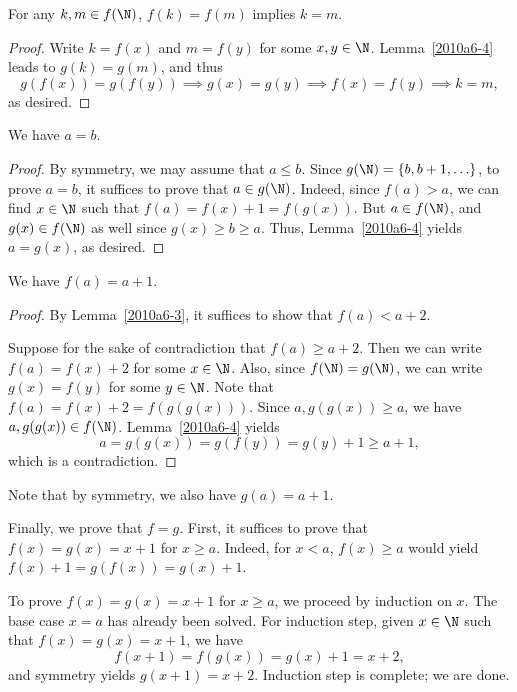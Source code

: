 \begin{lemma}\label{2010a6-4}
For any $k, m \in f(\N)$, $f(k) = f(m)$ implies $k = m$.
\end{lemma}
\begin{proof}
Write $k = f(x)$ and $m = f(y)$ for some $x, y \in \N$.
Lemma~\ref{2010a6-4} leads to $g(k) = g(m)$, and thus
\[ g(f(x)) = g(f(y)) \implies g(x) = g(y) \implies f(x) = f(y) \implies k = m, \]
    as desired.
\end{proof}

\begin{lemma}\label{2010a6-5}
We have $a = b$.
\end{lemma}
\begin{proof}
By symmetry, we may assume that $a \leq b$.
Since $g(\N) = \{b, b + 1, \ldots\}$, to prove $a = b$, it suffices to prove that $a \in g(\N)$.
Indeed, since $f(a) > a$, we can find $x \in \N$ such that $f(a) = f(x) + 1 = f(g(x))$.
But $a \in f(\N)$, and $g(x) \in f(\N)$ as well since $g(x) \geq b \geq a$.
Thus, Lemma~\ref{2010a6-4} yields $a = g(x)$, as desired.
\end{proof}

\begin{lemma}\label{2010a6-6}
We have $f(a) = a + 1$.
\end{lemma}
\begin{proof}
By Lemma~\ref{2010a6-3}, it suffices to show that $f(a) < a + 2$.

Suppose for the sake of contradiction that $f(a) \geq a + 2$.
Then we can write $f(a) = f(x) + 2$ for some $x \in \N$.
Also, since $f(\N) = g(\N)$, we can write $g(x) = f(y)$ for some $y \in \N$.
Note that $f(a) = f(x) + 2 = f(g(g(x)))$.
Since $a, g(g(x)) \geq a$, we have $a, g(g(x)) \in f(\N)$.
Lemma~\ref{2010a6-4} yields
\[ a = g(g(x)) = g(f(y)) = g(y) + 1 \geq a + 1, \]
    which is a contradiction.
\end{proof}

Note that by symmetry, we also have $g(a) = a + 1$.

Finally, we prove that $f = g$.
First, it suffices to prove that $f(x) = g(x) = x + 1$ for $x \geq a$.
Indeed, for $x < a$, $f(x) \geq a$ would yield $f(x) + 1 = g(f(x)) = g(x) + 1$.

To prove $f(x) = g(x) = x + 1$ for $x \geq a$, we proceed by induction on $x$.
The base case $x = a$ has already been solved.
For induction step, given $x \in \N$ such that $f(x) = g(x) = x + 1$, we have
\[ f(x + 1) = f(g(x)) = g(x) + 1 = x + 2, \]
    and symmetry yields $g(x + 1) = x + 2$.
Induction step is complete; we are done.

